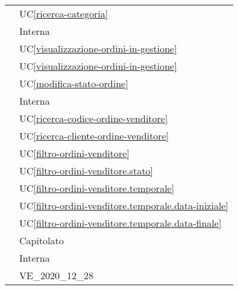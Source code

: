 \begin{longtable}{C{6cm} C{6cm}}
     & UC\ref{ricerca-categoria} \\

     & Interna \\

     & UC\ref{visualizzazione-ordini-in-gestione} \\

     & UC\ref{visualizzazione-ordini-in-gestione} \\

     & UC\ref{modifica-stato-ordine} \\

     & Interna \\

     & UC\ref{ricerca-codice-ordine-venditore} \\
        
     & UC\ref{ricerca-cliente-ordine-venditore} \\
        
     & UC\ref{filtro-ordini-venditore} \\
        
     & UC\ref{filtro-ordini-venditore.stato} \\
        
     & UC\ref{filtro-ordini-venditore.temporale} \\
        
     & UC\ref{filtro-ordini-venditore.temporale.data-iniziale} \\
        
     & UC\ref{filtro-ordini-venditore.temporale.data-finale} \\

     & Capitolato  \\

	 & Interna \\

	 & VE\_2020\_12\_28 \\


\end{longtable}
